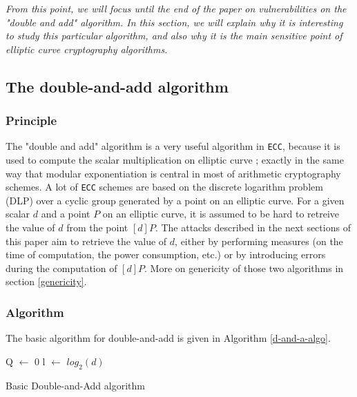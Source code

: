 \documentclass[journal]{IEEEtran}
\begin{document}
{\it From this point, we will focus until the end of the paper on vulnerabilities on the "double and add" algorithm. 
In this section, we will explain why it is interesting to study this particular algorithm, and also why it is the main sensitive point
of elliptic curve cryptography algorithms.}

\subsection{The double-and-add algorithm}

\subsubsection{Principle}
The "double and add" algorithm is a very useful algorithm in {\tt ECC}, because it is used to compute the scalar multiplication on elliptic curve ; 
exactly in the same way that modular exponentiation is central in most of arithmetic cryptography schemes. 
A lot of {\tt ECC} schemes are based on the discrete logarithm problem (DLP) over a cyclic group generated by a point on an elliptic curve.
For a given scalar $d$ and a point $P$ on an elliptic curve, it is assumed to be hard to retreive the value of $d$ from the point $[d]P$. 
The attacks described in the next sections of this paper aim to retrieve the value of $d$, either by performing measures (on the time of computation, 
the power consumption, etc.) or by introducing errors during the computation of $[d]P$.
More on genericity of those two algorithms 
in section \ref{genericity}.\\

\subsubsection{Algorithm}
The basic algorithm for double-and-add is given in Algorithm \ref{d-and-a-algo}.

\begin{algorithm}
    \SetAlgoLined %
   
    \SetSideCommentLeft 
    \SetNoFillComment

    
    
    Q $\leftarrow$ 0\;
    l $\leftarrow$ $log_2(d)$\;

    \bigskip

    \caption{Basic Double-and-Add algorithm}
    \label{d-and-a-algo}

\end{algorithm}
\end{document}
